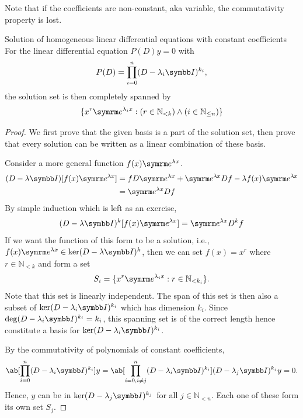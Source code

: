 Note that if the coefficients are non-constant, aka variable, the commutativity property is lost.

\begin{theorem}{Solution of homogeneous linear differential equations with constant coefficients}{}
  For the linear differential equation \(P(D)y = 0\) with
  \begin{equation}
    P(D) = \prod_{i=0}^{n} (D - \lambda_i \iden)^{k_i},
  \end{equation}
  the solution set is then completely spanned by
  \begin{equation}
    \{ x^r \e^{\lambda_i x} : (r \in \mathbb{N}_{<k}) \land (i \in \mathbb{N}_{\leq n}) \}
  \end{equation}
\end{theorem}

\begin{proof}
  We first prove that the given basis is a part of the solution set, then prove that
  every solution can be written as a linear combination of these basis.

  Consider a more general function \(f(x)\e^{\lambda x}\).
  \begin{align}
    (D - \lambda \iden) [f(x) \e^{\lambda x}] & = f D \e^{\lambda x} + \e^{\lambda x} Df - \lambda f(x) \e^{\lambda x} \\
                                              & = \e^{\lambda x} Df
  \end{align}
  By simple induction which is left as an exercise,
  \begin{equation}
    (D - \lambda \iden)^k [f(x) \e^{\lambda x}] = \e^{\lambda x} D^k f
  \end{equation}
  If we want the function of this form to be a solution, i.e.,
  \(f(x)\e^{\lambda x} \in \ker (D - \lambda \iden)^k\), then we can set \(f(x) = x^r\)
  where \(r \in \mathbb{N}_{<k}\) and form a set
  \begin{equation}
    S_i = \{x^r \e^{\lambda_i x} : r \in \mathbb{N}_{<k_i}\}.
  \end{equation}
  Note that this set is linearly independent. The span of this set is then also a
  subset of \(\ker (D - \lambda_i \iden)^{k_i}\) which has dimension \(k_i\). Since
  \(\deg (D - \lambda_i \iden)^{k_i} = k_i\), this spanning set is of the correct length
  hence constitute a basis for \(\ker (D - \lambda_i \iden)^{k_i}\).

  By the commutativity of polynomials of constant coefficients,
  \begin{equation}
    \ab[\prod_{i = 0}^n (D - \lambda_i \iden)^{k_i}] y = \ab[\prod_{i = 0, i \neq j}^n (D - \lambda_i \iden)^{k_i}] (D - \lambda_j \iden)^{k_j} y
                                                       = 0.
  \end{equation}
  Hence, \(y\) can be in \(\ker (D - \lambda_j \iden)^{k_j}\) for all \(j \in \mathbb{N}_{<n}\).
  Each one of these form its own set \(S_j\).


\end{proof}
